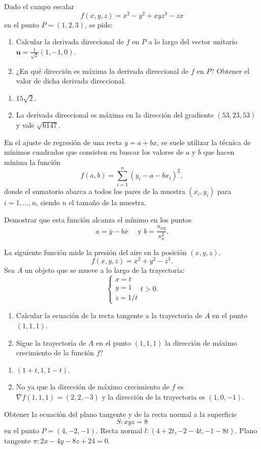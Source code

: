 {Dado el campo escalar
\[
f(x,y,z) = x^2-y^2+xyz^3-zx
\]
en el punto $P=(1,2,3)$, se pide:
\begin{enumerate}
\item Calcular la derivada direccional de $f$ en $P$ a lo largo del vector unitario $\mathbf{u}=\frac{1}{\sqrt2}(1,-1,0)$.
\item ¿En qué dirección es máxima la derivada direccional de $f$ en $P$? Obtener el valor de dicha derivada direccional.
\end{enumerate}
}
{\begin{enumerate}
\item $15\sqrt{2}$.
\item La derivada direccional es máxima en la dirección del gradiente $(53,23,53)$ y vale $\sqrt{6147}$.
\end{enumerate}
}
{
}


{En el ajuste de regresión de una recta $y=a+bx$, se suele utilizar la técnica de mínimos cuadrados que consisten en buscar los valores
de $a$ y $b$ que hacen mínima la función
\[
f(a,b)= \sum_{i=1}^{n}(y_i-a-bx_i)^2,
\]
donde el sumatorio abarca a todos los pares de la muestra $(x_i,y_i)$ para $i=1,\ldots, n$, siendo $n$ el tamaño de la muestra.

Demostrar que esta función alcanza el mínimo en los puntos
\[
a=\bar y-b\bar x \quad \mbox{ y } b=\frac{s_{xy}}{s_x^2}.
\]
}
{
}
{
}


{La siguiente función mide la presión del aire en la posición $(x,y,z)$.
\[
f(x,y,z)= x^2+y^2-z^3.
\]
Sea $A$ un objeto que se mueve a lo largo de la trayectoria:
\[
\begin{cases}
x=t\\
y=1\\
z=1/t
\end{cases}
t>0.
\]
\begin{enumerate}
\item Calcular la ecuación de la recta tangente a la trayectoria de $A$ en el punto $(1,1,1)$.
\item Sigue la trayectoria de $A$ en el punto $(1,1,1)$ la dirección de máximo crecimiento de la función $f$?
\end{enumerate}
}
{\begin{enumerate}
\item $(1+t, 1, 1-t)$.
\item No ya que la dirección de máximo crecimiento de $f$ es $\nabla f(1,1,1)=(2,2,-3)$ y la dirección de la trayectoria es $(1,0,-1)$.
\end{enumerate}
}
{
}


{Obtener la ecuación del plano tangente y de la recta normal a la superficie
\[
S:xyz=8
\]
en el punto $P=(4,-2,-1)$.
}
{Recta normal $l:(4+2t,-2-4t,-1-8t)$. Plano tangente $\pi: 2x-4y-8z+24=0$.
}
{
}

